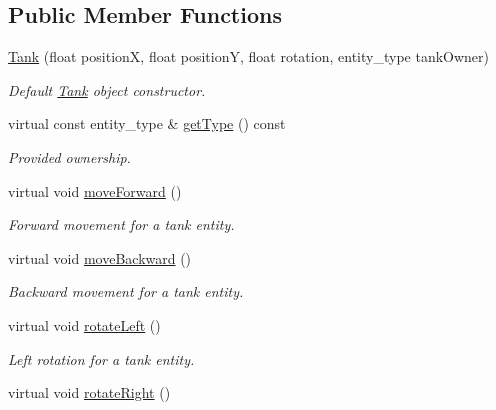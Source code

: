 \subsection*{Public Member Functions}
\begin{DoxyCompactItemize}
\item 
\hypertarget{class_tank_a6150bd84a309e15815122a050972ada3}{\hyperlink{class_tank_a6150bd84a309e15815122a050972ada3}{Tank} (float position\+X, float position\+Y, float rotation, entity\+\_\+type tank\+Owner)}\label{class_tank_a6150bd84a309e15815122a050972ada3}

\begin{DoxyCompactList}\small\item\em Default \hyperlink{class_tank}{Tank} object constructor. \end{DoxyCompactList}\item 
virtual const entity\+\_\+type \& \hyperlink{class_tank_a13af6c47c61682ebd1463fd9ef34439b}{get\+Type} () const 
\begin{DoxyCompactList}\small\item\em Provided ownership. \end{DoxyCompactList}\item 
\hypertarget{class_tank_a7d4317a50c215c97679cf9d2fb40e223}{virtual void \hyperlink{class_tank_a7d4317a50c215c97679cf9d2fb40e223}{move\+Forward} ()}\label{class_tank_a7d4317a50c215c97679cf9d2fb40e223}

\begin{DoxyCompactList}\small\item\em Forward movement for a tank entity. \end{DoxyCompactList}\item 
\hypertarget{class_tank_a6fa5abbf02267f1e30e485b043abc1c2}{virtual void \hyperlink{class_tank_a6fa5abbf02267f1e30e485b043abc1c2}{move\+Backward} ()}\label{class_tank_a6fa5abbf02267f1e30e485b043abc1c2}

\begin{DoxyCompactList}\small\item\em Backward movement for a tank entity. \end{DoxyCompactList}\item 
\hypertarget{class_tank_aed009351545e9019140e75bd8365e1ad}{virtual void \hyperlink{class_tank_aed009351545e9019140e75bd8365e1ad}{rotate\+Left} ()}\label{class_tank_aed009351545e9019140e75bd8365e1ad}

\begin{DoxyCompactList}\small\item\em Left rotation for a tank entity. \end{DoxyCompactList}\item 
\hypertarget{class_tank_a61c8d236aa98a258276654d02820966f}{virtual void \hyperlink{class_tank_a61c8d236aa98a258276654d02820966f}{rotate\+Right} ()}\label{class_tank_a61c8d236aa98a258276654d02820966f}


\end{DoxyCompactItemize}
